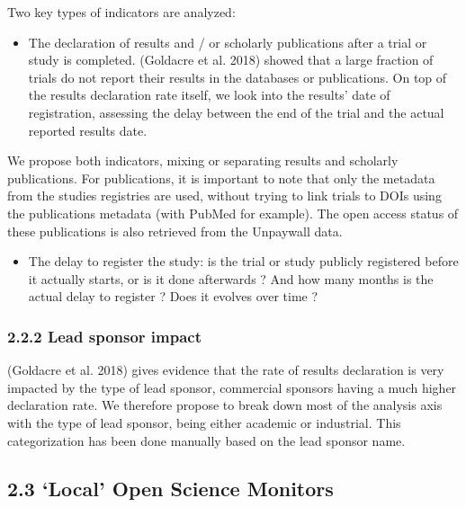 \documentclass[
]{article}
\providecommand{\tightlist}{%
  \setlength{\itemsep}{0pt}\setlength{\parskip}{0pt}}
\begin{document}
Two key types of indicators are analyzed:

\begin{itemize}
\tightlist
\item
  The declaration of results and / or scholarly publications after a
  trial or study is completed. (Goldacre et al. 2018) showed that a
  large fraction of trials do not report their results in the databases
  or publications. On top of the results declaration rate itself, we
  look into the results' date of registration, assessing the delay
  between the end of the trial and the actual reported results date.
\end{itemize}

We propose both indicators, mixing or separating results and scholarly
publications. For publications, it is important to note that only the
metadata from the studies registries are used, without trying to link
trials to DOIs using the publications metadata (with PubMed for
example). The open access status of these publications is also retrieved
from the Unpaywall data.

\begin{itemize}
\tightlist
\item
  The delay to register the study: is the trial or study publicly
  registered before it actually starts, or is it done afterwards ? And
  how many months is the actual delay to register ? Does it evolves over
  time ?
\end{itemize}

\hypertarget{lead-sponsor-impact}{%
\subsubsection{2.2.2 Lead sponsor impact}\label{lead-sponsor-impact}}

(Goldacre et al. 2018) gives evidence that the rate of results
declaration is very impacted by the type of lead sponsor, commercial
sponsors having a much higher declaration rate. We therefore propose to
break down most of the analysis axis with the type of lead sponsor,
being either academic or industrial. This categorization has been done
manually based on the lead sponsor name.

\hypertarget{local-open-science-monitors}{%
\subsection{2.3 `Local' Open Science
Monitors}\label{local-open-science-monitors}}
\end{document}
